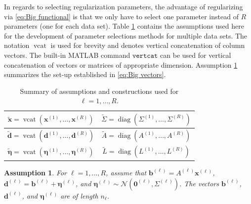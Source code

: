 \documentclass[12pt]{article}
\newcommand{\bVec}{\mathbf{b}}	%
\newcommand{\dVec}{\mathbf{d}}	%
\newcommand{\xVec}{\mathbf{x}}	%
\DeclareMathOperator{\diag}{diag}	%
\DeclareMathOperator{\vcat}{vcat}	%
\newcommand{\noise}{\eta}	%
\newcommand{\noiseVec}{\bm{\noise}}	%
\newcommand{\zeroVec}{\bm{0}}	%
\newtheorem{assumption}{Assumption}
\begin{document}
In regards to selecting regularization parameters, the advantage of regularizing via \eqref{eq:Big functional} is that we only have to select one parameter instead of $R$ parameters (one for each data set). Table \ref{tab:System assumptions} contains the assumptions used here for the development of parameter selections methods for multiple data sets. The notation $\vcat$ is used for brevity and denotes vertical concatenation of column vectors. The built-in MATLAB command $\mathtt{vertcat}$ can be used for vertical concatenation of vectors or matrices of appropriate dimension. Assumption \ref{Assumption_System} summarizes the set-up established in \eqref{eq:Big vectors}.

\begin{table}[ht!]
  \begin{center}
    \caption{Summary of assumptions and constructions used for $\ell = 1,\ldots,R$.}
    \label{tab:System assumptions}
    \begin{tabular}{|c|c|}
    \hline
    $\widetilde{\xVec} = \vcat\left(\xVec^{(1)},\ldots,\xVec^{(R)}\right)$ & $\widetilde{\Sigma} = \diag\left(\Sigma^{(1)},\ldots,\Sigma^{(R)}\right)$ \\
    \hline
    $\widetilde{\dVec} = \vcat\left(\dVec^{(1)},\ldots,\dVec^{(R)}\right)$ & $\widetilde{A} = \diag\left(A^{(1)},\ldots,A^{(R)}\right)$ \\
    \hline
    $\widetilde{\noiseVec} = \vcat\left(\noiseVec^{(1)},\ldots,\noiseVec^{(R)}\right)$ & $\widetilde{L} = \diag\left(L^{(1)},\ldots,L^{(R)}\right)$ \\
    \hline
    \end{tabular}
  \end{center}
\end{table}

\begin{assumption}
\label{Assumption_System}
For $\ell = 1,\ldots,R$, assume that $\bVec^{(\ell)} = {A^{(\ell)}}\xVec^{(\ell)}$, $\dVec^{(\ell)} = \bVec^{(\ell)} + \noiseVec^{(\ell)}$, and $\noiseVec^{(\ell)} \sim \mathcal{N}(\zeroVec^{(\ell)},\Sigma^{(\ell)})$. The vectors $\bVec^{(\ell)}$, $\dVec^{(\ell)}$, and $\noiseVec^{(\ell)}$ are of length $n_\ell$.
\end{assumption}
\end{document}

